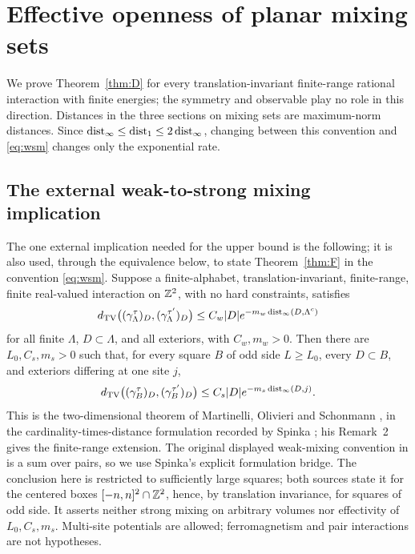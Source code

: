 \section{Effective openness of planar mixing sets}\label{sec:effective}

We prove Theorem~\ref{thm:D} for every translation-invariant finite-range rational interaction with finite energies; the symmetry and observable play no role in this direction. Distances in the three sections on mixing sets are maximum-norm distances. Since
\(\operatorname{dist}_\infty\le\operatorname{dist}_1\le2\operatorname{dist}_\infty\), changing between this convention and \eqref{eq:wsm} changes only the exponential rate.

\subsection{The external weak-to-strong mixing implication}

The one external implication needed for the upper bound is the following; it is also used, through the equivalence below, to state Theorem~\ref{thm:F} in the convention \eqref{eq:wsm}. Suppose a finite-alphabet, translation-invariant, finite-range, finite real-valued interaction on \(\mathbb Z^2\), with no hard constraints, satisfies
\begin{equation}\label{eq:wm-import}
d_{\mathrm{TV}}\bigl((\gamma_\Lambda^\tau)_D,(\gamma_\Lambda^{\tau'})_D\bigr)
\le C_w|D|e^{-m_w\operatorname{dist}_\infty(D,\Lambda^c)}
\end{equation}
for all finite \(\Lambda\), \(D\subset\Lambda\), and all exteriors, with \(C_w,m_w>0\). Then there are \(L_0,C_s,m_s>0\) such that, for every square \(B\) of odd side \(L\ge L_0\), every \(D\subset B\), and exteriors differing at one site \(j\),
\begin{equation}\label{eq:ssm-import}
d_{\mathrm{TV}}\bigl((\gamma_B^\tau)_D,(\gamma_B^{\tau'})_D\bigr)
\le C_s|D|e^{-m_s\operatorname{dist}_\infty(D,j)}.
\end{equation}
This is the two-dimensional theorem of Martinelli, Olivieri and Schonmann \cite[Theorem~1.1]{mos}, in the cardinality-times-distance formulation recorded by Spinka \cite[equations~(2)--(3), Section~1.2]{spinka}; his Remark~2 gives the finite-range extension. The original displayed weak-mixing convention in \cite{mos} is a sum over pairs, so we use Spinka's explicit formulation bridge. The conclusion here is restricted to sufficiently large squares; both sources state it for the centered boxes \([-n,n]^2\cap\mathbb Z^2\), hence, by translation invariance, for squares of odd side. It asserts neither strong mixing on arbitrary volumes nor effectivity of \(L_0,C_s,m_s\). Multi-site potentials are allowed; ferromagnetism and pair interactions are not hypotheses.

